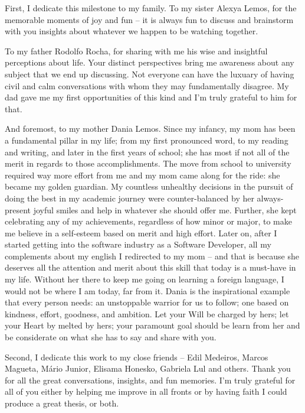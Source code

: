 First, I dedicate this milestone to my family. To my sister Alexya Lemos, for the memorable moments of joy and fun -- it is always fun to
discuss and brainstorm with you insights about whatever we happen to be watching together.

To my father Rodolfo Rocha, for sharing with me his wise and insightful perceptions about life.
Your distinct perspectives bring me awareness about any subject that we end up
discussing. Not everyone can have the luxuary of having
civil and calm conversations with whom they may fundamentally disagree. My dad gave me my first
opportunities of this kind and I'm truly grateful to him for that.

And foremost, to my mother Dania Lemos. Since my infancy, my mom has been a fundamental pillar in my life;
from my first pronounced word, to my reading and writing, and later in the first years of school; she has most if not
all of the merit in regards to those accomplishments. The move from school to university required way more effort
from me and my mom came along for the ride: she became my golden guardian. My countless unhealthy decisions in the pursuit
of doing the best in my academic journey were counter-balanced by her always-present joyful smiles and help in whatever
she should offer me. Further, she kept celebrating any of my achievements, regardless of how minor or major, to make me
believe in a self-esteem based on merit and high effort. Later on, after I started getting into the software industry
as a Software Developer, all my complements about my english I redirected to my mom -- and that is because she deserves
all the attention and merit about this skill that today is a must-have in my life. Without her there to keep me going
on learning a foreign language, I would not be where I am today, far from it. Dania is the inspirational example that every
person needs: an unstoppable warrior for us to follow; one based on kindness, effort, goodness, and ambition. Let your Will
be charged by hers; let your Heart by melted by hers; your paramount goal should be learn from her and be considerate on what
she has to say and share with you.

Second, I dedicate this work to my close friends -- Edil Medeiros, Marcos Magueta, Mário Junior, Elisama Honesko, Gabriela Lul and others. Thank you for
all the great conversations, insights, and fun memories. I'm truly grateful for all of you either by helping me improve in all
fronts or by having faith I could produce a great thesis, or both.
